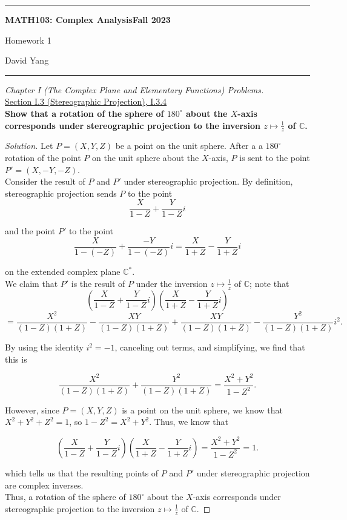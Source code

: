 \documentclass[11pt]{article}
\newcommand{\C}{\mathbb{C}}
\newenvironment{solution}
  {\renewcommand\qedsymbol{$\blacksquare$}\begin{proof}[Solution]}
  {\end{proof}}
\theoremstyle{definition}
\begin{document}
	\hrule
	\begin{center}
        \textbf{MATH103: Complex Analysis}\hfill \textbf{Fall 2023}\newline

		{\Large Homework 1}

		David Yang
	\end{center}

\hrule

\vspace{1em}

\textit{Chapter I (The Complex Plane and Elementary Functions) Problems.} \\

\underline{Section I.3 (Stereographic Projection), I.3.4} \\

\textbf{Show that a rotation of the sphere of $180^{\circ}$ about the $X$-axis corresponds under stereographic projection to the inversion $z \mapsto \frac{1}{z}$ of $\mathbb{C}$.} \\

\begin{solution}
    Let $P = (X, Y, Z)$ be a point on the unit sphere. After a a $180^{\circ}$ rotation of the point $P$ on the unit sphere about the $X$-axis, $P$ is sent to the point $P' = (X, -Y, -Z)$. \\
    
    Consider the result of $P$ and $P'$ under stereographic projection. By definition, stereographic projection sends $P$ to the point 
    \[\frac{X}{1-Z} + \frac{Y}{1-Z}i\] 
    
    and the point $P'$ to the point 
    \[ \frac{X}{1-(-Z)} + \frac{-Y}{1-(-Z)}i = \frac{X}{1+Z} - \frac{Y}{1+Z}i \]

    on the extended complex plane $\C^{*}$. \\

    We claim that $P'$ is the result of $P$ under the inversion $z \mapsto \frac{1}{z}$ of $\C$; note that
    \[ \left( \frac{X}{1-Z} + \frac{Y}{1-Z}i \right) \left( \frac{X}{1+Z} - \frac{Y}{1+Z}i \right)\]
    \[ = \frac{X^2}{(1-Z)(1+Z)} - \frac{XY}{(1-Z)(1+Z)} + \frac{XY}{(1-Z)(1+Z)} - \frac{Y^2}{(1-Z)(1+Z)} i^2. \]

    By using the identity $i^2 = -1$, canceling out terms, and simplifying, we find that this is

    \[ \frac{X^2}{(1-Z)(1+Z)} +\frac{Y^2}{(1-Z)(1+Z)} = \frac{X^2 + Y^2}{1-Z^2}.\]

    However, since $P = (X, Y, Z)$ is a point on the unit sphere, we know that $X^2 + Y^2 + Z^2 = 1$, so $1-Z^2 = X^2+Y^2$. Thus, we know that 

    \[ \left( \frac{X}{1-Z} + \frac{Y}{1-Z}i \right) \left( \frac{X}{1+Z} - \frac{Y}{1+Z}i \right) = \frac{X^2+Y^2}{1-Z^2} = 1.\]

    which tells us that the resulting points of $P$ and $P'$ under stereographic projection are complex inverses. \\
    
    Thus, a rotation of the sphere of $180^{\circ}$ about the $X$-axis corresponds under stereographic projection to the inversion $z \mapsto \frac{1}{z}$ of $\mathbb{C}$.
\end{solution}
\end{document}
